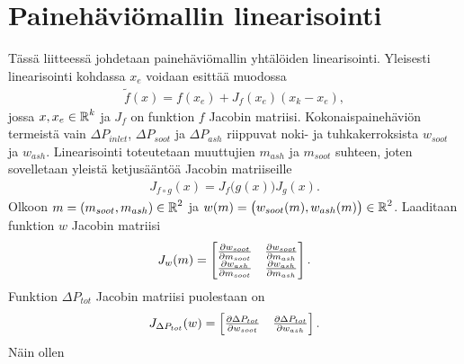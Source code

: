 
\chapter{Painehäviömallin linearisointi}%
\label{ch:linearisointi}

Tässä liitteessä johdetaan painehäviömallin yhtälöiden linearisointi. Yleisesti linearisointi kohdassa \(x_e\) voidaan esittää muodossa
\begin{align}
    \tilde{f}(x) = f(x_e) +J_f (x_e) (x_k-x_e),
\end{align}
jossa \(x, x_e \in \operatorname{\mathbb{R}}^k\) ja \(J_f\) on funktion \(f\) Jacobin matriisi. 
Kokonaispainehäviön termeistä vain \(\Delta P_{inlet}\), \(\Delta P_{soot}\) ja \(\Delta P_{ash}\) riippuvat noki- ja tuhkakerroksista \(w_{soot}\) ja \(w_{ash}\). 
Linearisointi toteutetaan muuttujien \(m_{ash}\) ja \( m_{soot}\) suhteen, joten
sovelletaan yleistä ketjusääntöä Jacobin matriiseille
\begin{align}
    J_{f \circ g}(x) = J_f\big(g(x)\big)  J_g(x).
\end{align}
Olkoon \(m = \left(m_{soot}, m_{ash}\right) \in \operatorname{\mathbb{R}}^2\) ja \(w(m) = \big(w_{soot}(m), w_{ash}(m)  \big) \in \operatorname{\mathbb{R}}^2\). Laaditaan funktion \(w\) Jacobin matriisi
\begin{align}
    J_w(m)=
    \begin{bmatrix} 
        \frac{\partial w_{soot}}{\partial m_{soot}}
        & 
        \frac{\partial w_{soot}}{\partial m_{ash}} 
        \\  
        \frac{\partial w_{ash}}{\partial m_{soot}}
        & 
        \frac{\partial w_{ash}}{\partial m_{ash}} 
     \end{bmatrix}.
\end{align}
 Funktion \(\Delta P_{tot}\) Jacobin matriisi puolestaan on 
\begin{align}
    J_{\Delta P_{tot}}(w) = \begin{bmatrix}   
        \frac{\partial \Delta P_{tot}}{\partial w_{soot}}
        &   
        \frac{\partial \Delta P_{tot}}{\partial w_{ash}}
     \end{bmatrix}.
\end{align}
Näin ollen 
